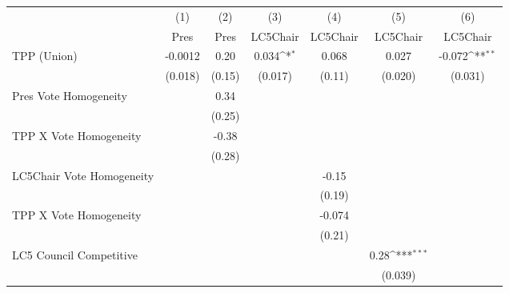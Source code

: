 {
\def\sym#1{\ifmmode^{#1}\else\(^{#1}\)\fi}
\begin{tabular}{l*{6}{c}}
\toprule
                &\multicolumn{1}{c}{(1)}&\multicolumn{1}{c}{(2)}&\multicolumn{1}{c}{(3)}&\multicolumn{1}{c}{(4)}&\multicolumn{1}{c}{(5)}&\multicolumn{1}{c}{(6)}\\
                &\multicolumn{1}{c}{Pres}&\multicolumn{1}{c}{Pres}&\multicolumn{1}{c}{LC5Chair}&\multicolumn{1}{c}{LC5Chair}&\multicolumn{1}{c}{LC5Chair}&\multicolumn{1}{c}{LC5Chair}\\
\midrule
TPP (Union)     &  -0.0012         &     0.20         &    0.034\sym{*}  &    0.068         &    0.027         &   -0.072\sym{**} \\
                &  (0.018)         &   (0.15)         &  (0.017)         &   (0.11)         &  (0.020)         &  (0.031)         \\
Pres Vote Homogeneity&                  &     0.34         &                  &                  &                  &                  \\
                &                  &   (0.25)         &                  &                  &                  &                  \\
TPP X Vote Homogeneity&                  &    -0.38         &                  &                  &                  &                  \\
                &                  &   (0.28)         &                  &                  &                  &                  \\
LC5Chair Vote Homogeneity&                  &                  &                  &    -0.15         &                  &                  \\
                &                  &                  &                  &   (0.19)         &                  &                  \\
TPP X Vote Homogeneity&                  &                  &                  &   -0.074         &                  &                  \\
                &                  &                  &                  &   (0.21)         &                  &                  \\
LC5 Council Competitive&                  &                  &                  &                  &     0.28\sym{***}&                  \\
                &                  &                  &                  &                  &  (0.039)         &                  \\

\end{tabular}}
